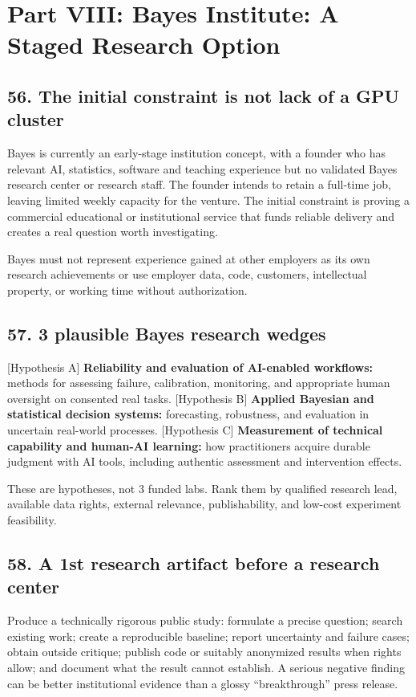 \section{Part VIII: Bayes Institute: A Staged Research Option}

\subsection{56. The initial constraint is not lack of a GPU cluster}

Bayes is currently an early-stage institution concept, with a founder who has relevant AI, statistics, software and teaching experience but no validated Bayes research center or research staff. The founder intends to retain a full-time job, leaving limited weekly capacity for the venture. The initial constraint is proving a commercial educational or institutional service that funds reliable delivery and creates a real question worth investigating.

Bayes must not represent experience gained at other employers as its own research achievements or use employer data, code, customers, intellectual property, or working time without authorization.

\subsection{57. 3 plausible Bayes research wedges}

[Hypothesis A] \textbf{Reliability and evaluation of AI-enabled workflows:} methods for assessing failure, calibration, monitoring, and appropriate human oversight on consented real tasks. [Hypothesis B] \textbf{Applied Bayesian and statistical decision systems:} forecasting, robustness, and evaluation in uncertain real-world processes. [Hypothesis C] \textbf{Measurement of technical capability and human-AI learning:} how practitioners acquire durable judgment with AI tools, including authentic assessment and intervention effects.

These are hypotheses, not 3 funded labs. Rank them by qualified research lead, available data rights, external relevance, publishability, and low-cost experiment feasibility.

\subsection{58. A 1st research artifact before a research center}

Produce a technically rigorous public study: formulate a precise question; search existing work; create a reproducible baseline; report uncertainty and failure cases; obtain outside critique; publish code or suitably anonymized results when rights allow; and document what the result cannot establish. A serious negative finding can be better institutional evidence than a glossy ``breakthrough'' press release.

